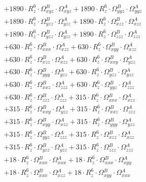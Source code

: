 \documentclass{article}
\begin{document}
\begin{subequations}
\begin{gather}
\begin{array}{c}
 \\[0.2em] 		 + 1890 \cdot R_{z}^{6} \cdot \Omega{}^{B}_{xyz} \cdot \Omega{}^{A}_{xyz}+ 1890 \cdot R_{z}^{6} \cdot \Omega{}^{B}_{yyz} \cdot \Omega{}^{A}_{yyz} 
 \\[0.2em] 		 + 1890 \cdot R_{z}^{6} \cdot \Omega{}^{B}_{yzz} \cdot \Omega{}^{A}_{yzz}+ 1890 \cdot R_{z}^{6} \cdot \Omega{}^{B}_{xzz} \cdot \Omega{}^{A}_{xzz} 
 \\[0.2em] 		 + 1890 \cdot R_{z}^{6} \cdot \Omega{}^{B}_{yzz} \cdot \Omega{}^{A}_{yzz}+ 1890 \cdot R_{z}^{6} \cdot \Omega{}^{B}_{zzz} \cdot \Omega{}^{A}_{zzz} 
 \\[0.2em] 		 + 630 \cdot R_{z}^{6} \cdot \Omega{}^{B}_{xxx} \cdot \Omega{}^{A}_{xzz}+ 630 \cdot R_{z}^{6} \cdot \Omega{}^{B}_{xyy} \cdot \Omega{}^{A}_{xzz} 
 \\[0.2em] 		 + 630 \cdot R_{z}^{6} \cdot \Omega{}^{B}_{xzz} \cdot \Omega{}^{A}_{xzz}+ 630 \cdot R_{z}^{6} \cdot \Omega{}^{B}_{xxy} \cdot \Omega{}^{A}_{yzz} 
 \\[0.2em] 		 + 630 \cdot R_{z}^{6} \cdot \Omega{}^{B}_{yyy} \cdot \Omega{}^{A}_{yzz}+ 630 \cdot R_{z}^{6} \cdot \Omega{}^{B}_{yzz} \cdot \Omega{}^{A}_{yzz} 
 \\[0.2em] 		 + 630 \cdot R_{z}^{6} \cdot \Omega{}^{B}_{xxz} \cdot \Omega{}^{A}_{zzz}+ 630 \cdot R_{z}^{6} \cdot \Omega{}^{B}_{yyz} \cdot \Omega{}^{A}_{zzz} 
 \\[0.2em] 		 + 630 \cdot R_{z}^{6} \cdot \Omega{}^{B}_{zzz} \cdot \Omega{}^{A}_{zzz}+ 315 \cdot R_{z}^{6} \cdot \Omega{}^{B}_{xxx} \cdot \Omega{}^{A}_{xzz} 
 \\[0.2em] 		 + 315 \cdot R_{z}^{6} \cdot \Omega{}^{B}_{xxy} \cdot \Omega{}^{A}_{yzz}+ 315 \cdot R_{z}^{6} \cdot \Omega{}^{B}_{xxz} \cdot \Omega{}^{A}_{zzz} 
 \\[0.2em] 		 + 315 \cdot R_{z}^{6} \cdot \Omega{}^{B}_{xyy} \cdot \Omega{}^{A}_{xzz}+ 315 \cdot R_{z}^{6} \cdot \Omega{}^{B}_{yyy} \cdot \Omega{}^{A}_{yzz} 
 \\[0.2em] 		 + 315 \cdot R_{z}^{6} \cdot \Omega{}^{B}_{yyz} \cdot \Omega{}^{A}_{zzz}+ 315 \cdot R_{z}^{6} \cdot \Omega{}^{B}_{xzz} \cdot \Omega{}^{A}_{xzz} 
 \\[0.2em] 		 + 315 \cdot R_{z}^{6} \cdot \Omega{}^{B}_{yzz} \cdot \Omega{}^{A}_{yzz}+ 315 \cdot R_{z}^{6} \cdot \Omega{}^{B}_{zzz} \cdot \Omega{}^{A}_{zzz} 
 \\[0.2em] 		 + 18 \cdot R_{z}^{6} \cdot \Omega{}^{B}_{xxx} \cdot \Omega{}^{A}_{xxx}+ 18 \cdot R_{z}^{6} \cdot \Omega{}^{B}_{xxx} \cdot \Omega{}^{A}_{xyy} 
 \\[0.2em] 		 + 18 \cdot R_{z}^{6} \cdot \Omega{}^{B}_{xxx} \cdot \Omega{}^{A}_{xzz}+ 18 \cdot R_{z}^{6} \cdot \Omega{}^{B}_{xyy} \cdot \Omega{}^{A}_{xxx} 

\end{array}
\end{gather}
\end{subequations}
\end{document}
